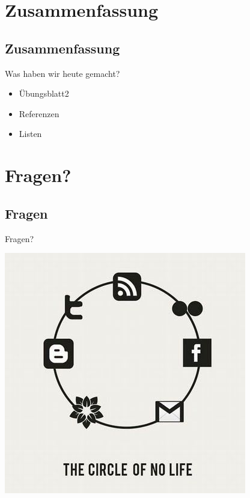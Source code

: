 \documentclass[18pt]{beamer}
\begin{document}
\section{Zusammenfassung}
\subsection{Zusammenfassung}
\begin{frame}{Was haben wir heute gemacht?}
	\begin{itemize}
		\item Übungsblatt2
		\item Referenzen
		\item Listen
	\end{itemize}
\end{frame}

\section{Fragen?}
\subsection*{Fragen} %
\begin{frame}	
	\begin{center}
		\huge{Fragen?}
	\end{center}
\end{frame}



\begin{frame}[full]
\includegraphics[scale=0.55]{bilder/comics/September-25-2011-18-44-59-aa71ce1bd67502c27bc56a6b8d724897.jpeg}
\end{frame}
\end{document}
